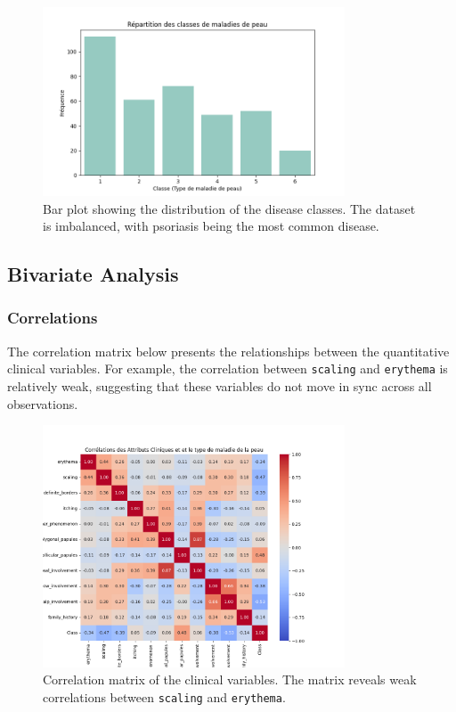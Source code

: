 \documentclass[a4paper,12pt]{article}
\begin{document}
\begin{figure}[h!]
\centering
\includegraphics[width=0.8\textwidth]{Repartition_classes.png}
\caption{Bar plot showing the distribution of the disease classes. The dataset is imbalanced, with psoriasis being the most common disease.}
\end{figure}

\subsection{Bivariate Analysis}

\subsubsection{Correlations}

The correlation matrix below presents the relationships between the quantitative clinical variables. For example, the correlation between \texttt{scaling} and \texttt{erythema} is relatively weak, suggesting that these variables do not move in sync across all observations.

\begin{figure}[h!]
\centering
\includegraphics[width=0.8\textwidth]{correlation_matrix.png}
\caption{Correlation matrix of the clinical variables. The matrix reveals weak correlations between \texttt{scaling} and \texttt{erythema}.}
\end{figure}
\end{document}
